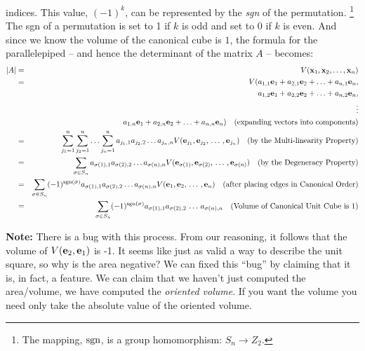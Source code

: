 \documentclass{article}
\begin{document}
indices. This value, $(-1)^k$, can be represented by the {\em sgn\/}
of the permutation.%
\footnote{The mapping, ${\rm sgn\/}$, is a group homomorphism: $S_n \rightarrow Z_2$.}
The sgn of a permutation is set to 1 if $k$ is odd and set to 0
if $k$ is even. And since we know the volume of the canonical cube is $1$,
the formula for the parallelepiped -- and hence the
determinant of the matrix $A$ -- becomes:
\begin{eqnarray}
  |A| & = & V({\bf x}_1, {\bf x}_2, \ldots, {\bf x}_n) \nonumber \\
  & = & V(a_{1, 1} {\bf e}_1 + a_{2, 1} {\bf e}_2 + \ldots + a_{n,1}{\bf e}_n, \nonumber \\
      & \hphantom{=} & \hphantom{V(}a_{1, 2} {\bf e}_1 + a_{2, 2} {\bf e}_2
                       + \ldots + a_{n,2}{\bf e}_n, \nonumber \\
      & \hphantom{=} & \hphantom{V(} \vdots \nonumber \\
      & \hphantom{=} & \hphantom{V(} a_{1, n} {\bf e}_1 + a_{2, n} {\bf e}_2
                       + \ldots + a_{n,n}{\bf e}_n)
                       \nonumber \quad
                       \text{(expanding vectors into components)} \nonumber \\   
      & = & \sum_{j_1=1}^n \sum_{j_2=1}^n \ldots \sum_{j_n=1}^n 
            a_{j_1,1} a_{j_2, 2} \ldots a_{j_n, n}
            V({\bf e}_{j_1}, {\bf e}_{j_2}, \, \ldots \, , {\bf e}_{j_n}) 
            \quad \text{(by the Multi-linearity Property)} \nonumber \\
  & = & \sum_{\sigma \in S_n} a_{\sigma(1), 1} a_{\sigma(2),2} \ldots a_{\sigma(n), n}
        V({\bf e}_{\sigma(1)}, {\bf e}_{\sigma(2)}, \, \ldots \, , {\bf e}_{\sigma(n)})
        \quad \text{(by the Degeneracy Property)} \nonumber \\
      & = & \sum_{\sigma \in S_n} (-1)^{{\rm sgn}(\sigma)}
            a_{\sigma(1), 1} a_{\sigma(2),2} \ldots a_{\sigma(n), n}
        V({\bf e}_{1}, {\bf e}_{2}, \, \ldots \, , {\bf e}_{n})
        \quad \text{(after placing edges in Canonical Order)}\nonumber \\
      & = & \sum_{\sigma \in S_n} (-1)^{{\rm sgn}(\sigma)}
            a_{\sigma(1), 1} a_{\sigma(2),2} \, \ldots \, a_{\sigma(n), n} \quad
        \text{(Volume of Canonical Unit Cube is $1$)}
\end{eqnarray}


{\bf Note:\/} There is a bug with this process. From our reasoning, it follows that
the volume of $V({\bf e}_2, {\bf e}_1)$ is -1. It seems like just as valid a way to
describe the unit square, so why is the area negative? We can fixed this ``bug'' by
claiming that it is, in fact, a feature. We can claim that we haven't just
computed the area/volume,
we have computed the {\em oriented volume\/}.
If you want the volume you need only take the absolute value of the oriented volume.
\end{document}
